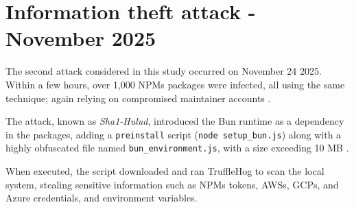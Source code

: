 \section{Information theft attack - November 2025}

The second attack considered in this study occurred on November 24 2025.
Within a few hours, over 1,000 \acp{NPM} packages were infected,
all using the same technique; again relying on compromised maintainer accounts
\cite{ravie2025secondsha1hulud}.

The attack, known as \textit{Sha1-Hulud}, introduced the Bun runtime
as a dependency in the packages,
adding a \texttt{preinstall} script (\texttt{node setup\_bun.js})
along with a highly obfuscated file named \texttt{bun\_environment.js},
with a size exceeding 10 MB \cite{helixguard2025malicioussha1hulud}.

When executed, the script downloaded and ran TruffleHog
to scan the local system,
stealing sensitive information such as \acp{NPM} tokens,
\acp{AWS}, \acp{GCP}, and Azure credentials, and environment variables.


